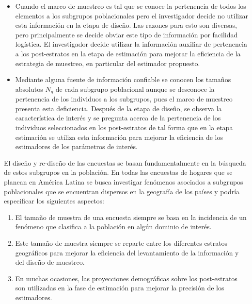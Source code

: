 \documentclass[
  12pt,
  spanish,
]{book}
\providecommand{\tightlist}{%
  \setlength{\itemsep}{0pt}\setlength{\parskip}{0pt}}
\begin{document}
\begin{itemize}
  \begin{itemize}
  \tightlist
  \item
    Cuando el marco de muestreo es tal que se conoce la pertenencia de todos los elementos a los subgrupos poblacionales pero el investigador decide no utilizar esta información en la etapa de diseño. Las razones para esto son diversas, pero principalmente se decide obviar este tipo de información por facilidad logística. El investigador decide utilizar la información auxiliar de pertenencia a los post-estratos en la etapa de estimación para mejorar la eficiencia de la estrategia de muestreo, en particular del estimador propuesto.
  \item
    Mediante alguna fuente de información confiable se conocen los tamaños absolutos \(N_g\) de cada subgrupo poblacional aunque se desconoce la pertenencia de los individuos a los subgrupos, pues el marco de muestreo presenta esta deficiencia. Después de la etapa de diseño, se observa la característica de interés y se pregunta acerca de la pertenencia de los individuos seleccionados en los post-estratos de tal forma que en la etapa estimación se utiliza esta información para mejorar la eficiencia de los estimadores de los parámetros de interés.
  \end{itemize}
\end{itemize}

El diseño y re-diseño de las encuestas se basan fundamentalmente en la búsqueda de estos subgrupos en la población. En todas las encuestas de hogares que se planean en América Latina se busca investigar fenómenos asociados a subgrupos poblacionales que se encuentran dispersos en la geografía de los países y podría especificar los siguientes aspectos:

\begin{enumerate}
\def\labelenumi{\arabic{enumi}.}
\tightlist
\item
  El tamaño de muestra de una encuesta siempre se basa en la incidencia de un fenómeno que clasifica a la población en algún dominio de interés.
\item
  Este tamaño de muestra siempre se reparte entre los diferentes estratos geográficos para mejorar la eficiencia del levantamiento de la información y del diseño de muestreo.
\item
  En muchas ocasiones, las proyecciones demográficas sobre los post-estratos son utilizadas en la fase de estimación para mejorar la precisión de los estimadores.
\end{enumerate}
\end{document}
